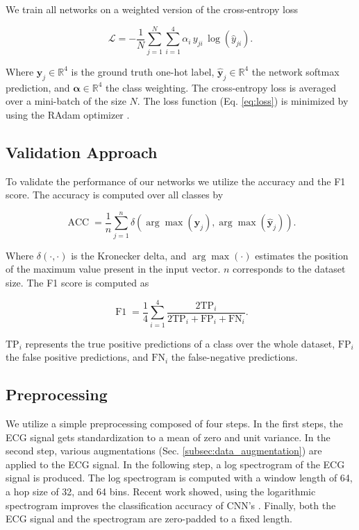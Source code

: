 We train all networks on a weighted version of the cross-entropy loss \cite{Goodfellow2016}

\begin{equation} \label{eq:loss}
    \mathcal{L} = -\frac{1}{N}\sum_{j=1}^{N}\sum_{i=1}^{4}\alpha_{i}\,y_{ji}\,\log(\hat{y}_{ji}).
\end{equation}

Where $\mathbf{y}_{j}\in\mathbb{R}^4$ is the ground truth one-hot label, $\hat{\mathbf{y}}_{j}\in\mathbb{R}^4$ the network softmax prediction, and $\mathbf{\alpha}\in\mathbb{R}^4$ the class weighting. The cross-entropy loss is averaged over a mini-batch of the size $N$. The loss function (Eq. \ref{eq:loss}) is minimized by using the RAdam optimizer \cite{Liu2020}.

\subsection{Validation Approach} \label{subsec:validation}

To validate the performance of our networks we utilize the accuracy and the F1 score. The accuracy is computed over all classes by

\begin{equation}\label{eq:acc}
    \operatorname{ACC}=\frac{1}{n}\sum_{j=1}^{n}\delta\left(\arg\max(\mathbf{y}_{j}), \arg\max(\hat{\mathbf{y}}_{j})\right).
\end{equation}

Where $\delta(\cdot, \cdot)$ is the Kronecker delta, and $\arg\max(\cdot)$ estimates the position of the maximum value present in the input vector. $n$ corresponds to the dataset size. The F1 score is computed as

\begin{equation}\label{eq:f1}
    \operatorname{F1}=\frac{1}{4}\sum_{i=1}^{4}\frac{2\text{TP}_{i}}{2\text{TP}_{i} + \text{FP}_{i} + \text{FN}_{i}}.
\end{equation}

$\text{TP}_{i}$ represents the true positive predictions of a class over the whole dataset, $\text{FP}_{i}$ the false positive predictions, and $\text{FN}_{i}$ the false-negative predictions.

\subsection{Preprocessing} \label{subsec:preprocessing}

We utilize a simple preprocessing composed of four steps. In the first steps, the ECG signal gets standardization to a mean of zero and unit variance. In the second step, various augmentations (Sec. \ref{subsec:data_augmentation}) are applied to the ECG signal. In the following step, a log spectrogram of the ECG signal is produced. The log spectrogram is computed with a window length of 64, a hop size of 32, and 64 bins. Recent work showed, using the logarithmic spectrogram improves the classification accuracy of CNN's \cite{Zihlmann2017}. Finally, both the ECG signal and the spectrogram are zero-padded to a fixed length.

